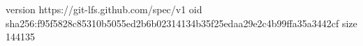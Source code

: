 version https://git-lfs.github.com/spec/v1
oid sha256:f95f5828c85310b5055ed2b6b02314134b35f25edaa29e2c4b99ffa35a3442cf
size 144135
